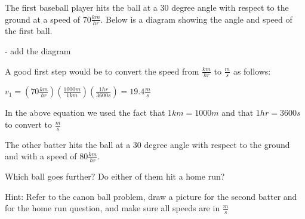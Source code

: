 \documentclass[12pt]{article}
\begin{document}
The first baseball player hits the ball at a 30 degree angle with respect to the ground at a speed of 70$\frac{km}{hr}$. Below is a diagram showing the angle and speed of the first ball.

- add the diagram

A good first step would be to convert the speed from $\frac{km}{hr}$ to $\frac{m}{s}$ as follows:

$v_1 = (70 \frac{km}{hr})(\frac{1000m}{1km})(\frac{1hr}{3600s}) = 19.4 \frac{m}{s}$

In the above equation we used the fact that $1km = 1000m$ and that $1hr = 3600s$ to convert to $\frac{m}{s}$

The other batter hits the ball at a 30 degree angle with respect to the ground and with a speed of $80 \frac{km}{hr}$.


Which ball goes further? Do either of them hit a home run?

Hint: Refer to the canon ball problem, draw a picture for the second batter and for the home run question, and make sure all speeds are in $\frac{m}{s}$

\end{document}
